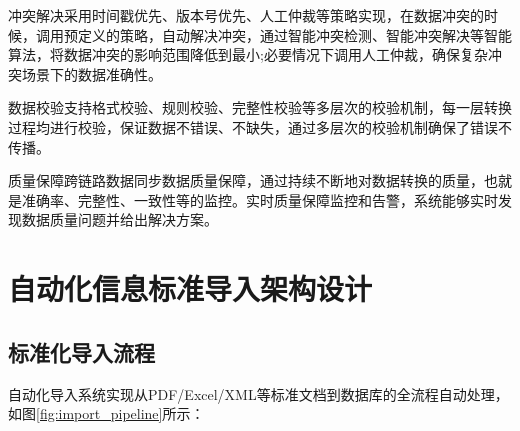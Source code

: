 冲突解决采用时间戳优先、版本号优先、人工仲裁等策略实现，在数据冲突的时候，调用预定义的策略，自动解决冲突，通过智能冲突检测、智能冲突解决等智能算法，将数据冲突的影响范围降低到最小;必要情况下调用人工仲裁，确保复杂冲突场景下的数据准确性。

数据校验支持格式校验、规则校验、完整性校验等多层次的校验机制，每一层转换过程均进行校验，保证数据不错误、不缺失，通过多层次的校验机制确保了错误不传播。

质量保障跨链路数据同步数据质量保障，通过持续不断地对数据转换的质量，也就是准确率、完整性、一致性等的监控。实时质量保障监控和告警，系统能够实时发现数据质量问题并给出解决方案。

\section{自动化信息标准导入架构设计}

\subsection{标准化导入流程}

自动化导入系统实现从PDF/Excel/XML等标准文档到数据库的全流程自动处理，如图\ref{fig:import_pipeline}所示：

